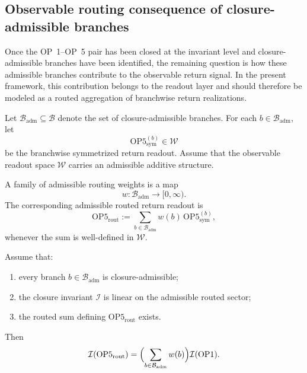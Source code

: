 \subsection{Observable routing consequence of closure-admissible branches}

Once the OP~1--OP~5 pair has been closed at the invariant level and closure-admissible branches have been identified, the remaining question is how these admissible branches contribute to the observable return signal. In the present framework, this contribution belongs to the readout layer and should therefore be modeled as a routed aggregation of branchwise return realizations.

Let $\mathcal{B}_{\mathrm{adm}}\subseteq\mathcal{B}$ denote the set of closure-admissible branches. For each $b\in\mathcal{B}_{\mathrm{adm}}$, let
\[
\mathrm{OP5}^{(b)}_{\mathrm{sym}}\in\mathcal{W}
\]
be the branchwise symmetrized return readout. Assume that the observable readout space $\mathcal{W}$ carries an admissible additive structure.

\begin{definition}
A family of admissible routing weights is a map
\[
w:\mathcal{B}_{\mathrm{adm}}\to [0,\infty).
\]
The corresponding admissible routed return readout is
\[
\mathrm{OP5}_{\mathrm{rout}}
:=
\sum_{b\in\mathcal{B}_{\mathrm{adm}}} w(b)\,\mathrm{OP5}^{(b)}_{\mathrm{sym}},
\]
whenever the sum is well-defined in $\mathcal{W}$.
\end{definition}

\begin{proposition}\label{prop:op-admissible-routing}
Assume that:
\begin{enumerate}[leftmargin=2em,label=(\roman*)]
\item every branch $b\in\mathcal{B}_{\mathrm{adm}}$ is closure-admissible;
\item the closure invariant $\mathcal{I}$ is linear on the admissible routed sector;
\item the routed sum defining $\mathrm{OP5}_{\mathrm{rout}}$ exists.
\end{enumerate}
Then
\[
\mathcal{I}(\mathrm{OP5}_{\mathrm{rout}})
=
\Bigl(\sum_{b\in\mathcal{B}_{\mathrm{adm}}} w(b)\Bigr)\mathcal{I}(\mathrm{OP1}).
\]
\end{proposition}

